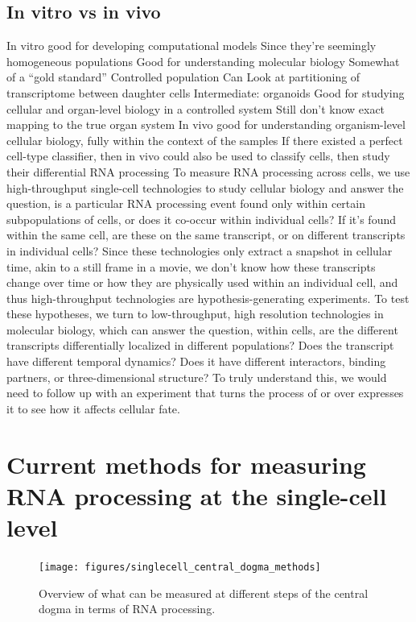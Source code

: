 \subsection{In vitro vs in vivo}
In vitro
good for developing computational models
Since they're seemingly homogeneous populations
Good for understanding molecular biology
Somewhat of a ``gold standard''
Controlled population
Can Look at partitioning of transcriptome between daughter cells
Intermediate: organoids
Good for studying cellular and organ-level biology in a controlled system
Still don't know exact mapping to the true organ system
In vivo
good for understanding organism-level cellular biology, fully within the context of the samples
If there existed a perfect cell-type classifier, then in vivo could also be used to classify cells, then study their differential RNA processing
To measure RNA processing across cells, we use high-throughput single-cell technologies to study cellular biology and answer the question, is a particular RNA processing event found only within certain subpopulations of cells, or does it co-occur within individual cells? If it's found within the same cell, are these on the same transcript, or on different transcripts in individual cells? Since these technologies only extract a snapshot in cellular time, akin to a still frame in a movie, we don't know how these transcripts change over time or how they are physically used within an individual cell, and thus high-throughput technologies are hypothesis-generating experiments.
To test these hypotheses, we turn to low-throughput, high resolution technologies in molecular biology, which can answer the question, within cells, are the different transcripts differentially localized in different populations? Does the transcript have different temporal dynamics? Does it have different interactors, binding partners, or three-dimensional structure? To truly understand this, we would need to follow up with an experiment that turns the process of or over expresses it to see how it affects cellular fate.


\section{Current methods for measuring RNA processing at the single-cell level}

\begin{figure}
  \centering
  \texttt{[image: figures/singlecell\_central\_dogma\_methods]}
  \caption{Overview of what can be measured at different steps of the central dogma in terms of RNA processing.}
\label{fig:singlecell_central_dogma_methods}
\end{figure}

